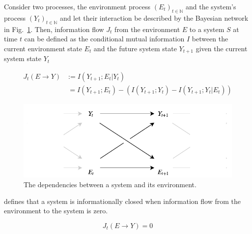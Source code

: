 \documentclass[utf8]{article}
\begin{document}
			\noindent
			Consider two processes, the environment process $(E_t)_{t \in \mathbb{N}}$ and the system's process $(Y_t)_{t \in \mathbb{N}}$ and let their interaction be described by the Bayesian network in Fig.~\ref{fig:SystemAndEnv}. Then, information flow $J_{t}$ from the environment $E$ to a system $S$ at time $t$ can be defined as the conditional mutual information $I$ between the current environment state $E_{t}$  and the future system state $Y_{t+1}$ given the current system state $Y_{t}$

				\begin{equation}
    				\label{eq:InformationFlow}
    				\left.\begin{array}
    				{rl}{J_{t}(E \rightarrow Y )} & {:= I(Y_{t+1};E_{t}|Y_{t})} \\
    				{ } & { \ = I(Y_{t+1};E_{t}) - (I(Y_{t+1};Y_{t})-I(Y_{t+1};Y_{t}|E_{t}))}
    				\end{array}\right.
				\end{equation}

            
				\begin{figure}
					\includegraphics[width=\textwidth]{WritingMaterials/Fig_SystemAndEnv/SystemAndEnv_2.pdf}
					\caption{The dependencies between a system and its environment.} %
					\label{fig:SystemAndEnv}
				\end{figure}


			\noindent
			\cite{BERTSCHINGER.2006} defines that a system is informationally closed when information flow from the environment to the system is zero.

				\begin{equation}
				J_{t}(E \rightarrow Y )=0
				\label{eq:informationflow2}
				\end{equation}
\end{document}

